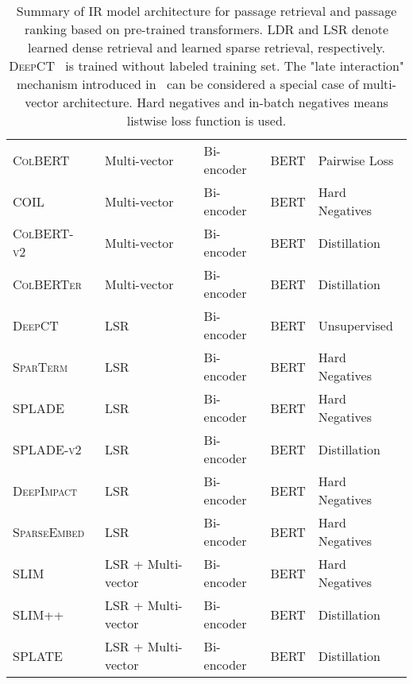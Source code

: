 \begin{table*}[t!]
{\begin{tabular}{lllll}
\textsc{ColBERT}~\cite{khattab2020colbert} & Multi-vector & Bi-encoder & \textsc{BERT} & Pairwise Loss \\
\textsc{COIL}~\cite{gao-etal-2021-coil} & Multi-vector & Bi-encoder & \textsc{BERT} & Hard Negatives\\
\textsc{ColBERT-v2}~\cite{santhanam-etal-2022-colbertv2} & Multi-vector & Bi-encoder & \textsc{BERT} & Distillation \\
\textsc{ColBERTer}~\cite{hofstatter2022introducing} & Multi-vector & Bi-encoder & \textsc{BERT} & Distillation \\
\textsc{DeepCT}~\cite{dai2019context} & LSR & Bi-encoder & \textsc{BERT} & Unsupervised \\
\textsc{SparTerm}~\cite{bai2020sparterm} & LSR & Bi-encoder & \textsc{BERT} & Hard Negatives \\
\textsc{SPLADE}~\cite{formal21splade} & LSR & Bi-encoder & \textsc{BERT} & Hard Negatives \\
\textsc{SPLADE-v2}~\cite{formal21spladev2} & LSR & Bi-encoder & \textsc{BERT} & Distillation \\
\textsc{DeepImpact}~\cite{mallia2021learning} & LSR & Bi-encoder & \textsc{BERT} & Hard Negatives \\
\textsc{SparseEmbed}~\cite{kong2023sparseembed} & LSR & Bi-encoder & \textsc{BERT} & Hard Negatives \\
\textsc{SLIM}~\cite{li2023slim}  & LSR + Multi-vector & Bi-encoder & \textsc{BERT} & Hard Negatives \\
\textsc{SLIM++}~\cite{li2023slim}  & LSR + Multi-vector & Bi-encoder & \textsc{BERT} & Distillation \\
\textsc{SPLATE}~\cite{formal2024splate} & LSR + Multi-vector & Bi-encoder & \textsc{BERT} & Distillation \\

\bottomrule
\end{tabular}
}
\caption{Summary of IR model architecture for passage retrieval and passage ranking based on pre-trained transformers. LDR and LSR denote learned dense retrieval and learned sparse retrieval, respectively. \textsc{DeepCT}~\cite{dai2019context} is trained without labeled training set. The "late interaction" mechanism introduced in~\cite{khattab2020colbert,santhanam-etal-2022-colbertv2} can be considered a special case of multi-vector architecture. Hard negatives and in-batch negatives means listwise loss function is used.}
\label{tab:bert_model_appendix}
\end{table*}

